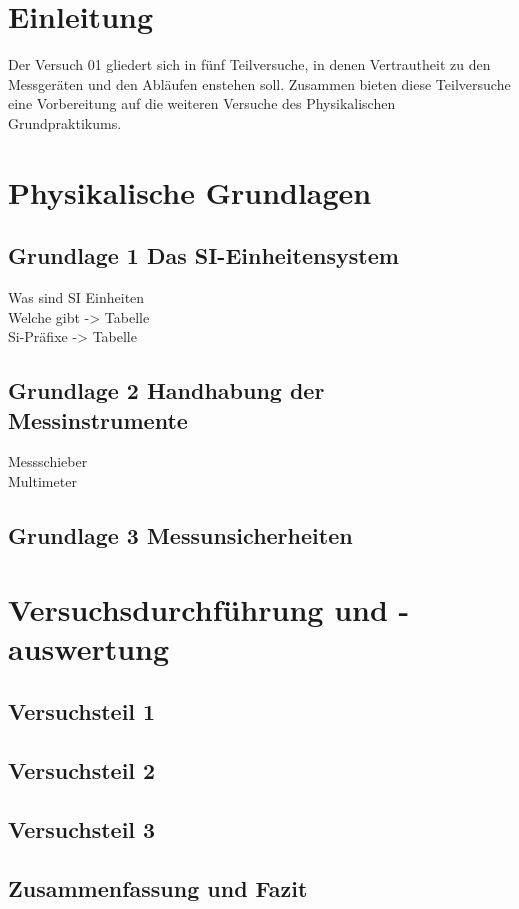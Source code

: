\documentclass[12pt, a4paper, DIV=12, BCOR=1cm]{scrartcl}
\begin{document}
\restoregeometry
\pagebreak
\tableofcontents
\newpage
\section{Einleitung}
Der Versuch 01 gliedert sich in fünf Teilversuche, in denen Vertrautheit zu den  Messgeräten und den Abläufen enstehen soll.
Zusammen bieten diese Teilversuche eine Vorbereitung auf die weiteren Versuche des Physikalischen Grundpraktikums.
\section{Physikalische Grundlagen}
\subsection{Grundlage 1 Das SI-Einheitensystem}
Was sind SI Einheiten \\
Welche gibt -> Tabelle\\
Si-Präfixe -> Tabelle 

\subsection{Grundlage 2 Handhabung der Messinstrumente}
Messschieber\\
Multimeter\\
\subsection{Grundlage 3 Messunsicherheiten}

\section{Versuchsdurchführung und -auswertung}
\subsection{Versuchsteil 1}
\subsection{Versuchsteil 2}
\subsection{Versuchsteil 3}
\subsection{Zusammenfassung und Fazit}
\end{document}
